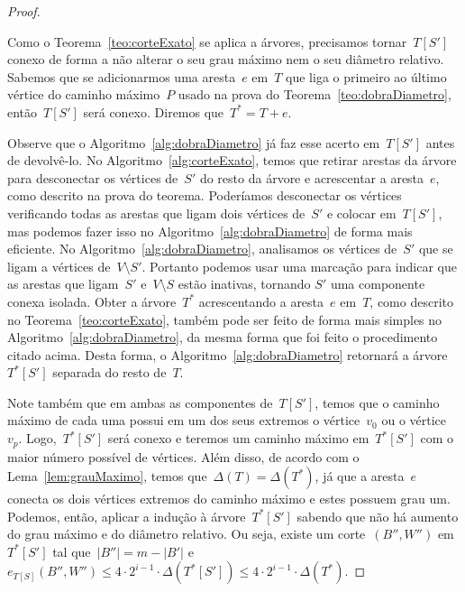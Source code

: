 \begin{proof}
\begin{center}
\begin{tikzpicture}
			\end{tikzpicture} \end{center}
			Como o Teorema~\ref{teo:corteExato} se aplica a 
			árvores, precisamos tornar~$T[S']$ conexo de forma a não 
			alterar o seu grau máximo nem o seu diâmetro relativo.
			Sabemos que se adicionarmos uma aresta~$e$ em~$T$ que 
			liga o primeiro ao último vértice do caminho máximo~$P$
			usado na prova do Teorema~\ref{teo:dobraDiametro},
			então~$T[S']$ será conexo. 
			Diremos que~${T^* = T+ e}$.

			Observe que o Algoritmo~\ref{alg:dobraDiametro} já faz
			esse acerto em~$T[S']$ antes de devolvê-lo.
			No Algoritmo~\ref{alg:corteExato}, temos que 
			retirar arestas da árvore para 
			desconectar os vértices de~$S'$ do resto da árvore
			e acrescentar a aresta~$e$, como descrito na prova do teorema.
			Poderíamos desconectar os vértices verificando todas as arestas que 
			ligam dois vértices de~$S'$ e colocar em~$T[S']$, mas podemos
			fazer isso no Algoritmo~\ref{alg:dobraDiametro} de forma 
			mais eficiente. 
			No Algoritmo~\ref{alg:dobraDiametro},
			analisamos os vértices de~$S'$ que se ligam a vértices 
			de~$V\setminus S'$. 
			Portanto podemos usar uma marcação para indicar que as 
			arestas que ligam~$S'$ e~${V\setminus S}$ estão inativas, 
			tornando $S'$ uma componente conexa isolada. 
			Obter a árvore~$T^*$ acrescentando a aresta~$e$ em~$T$, como descrito no
			Teorema~\ref{teo:corteExato}, também pode ser feito de 
			forma mais simples no Algoritmo~\ref{alg:dobraDiametro},
			da mesma forma que foi feito o procedimento citado acima.
			Desta forma, o Algoritmo~\ref{alg:dobraDiametro} retornará
			a árvore~$T^*[S']$ separada do resto de~$T$.

			Note também que em ambas as componentes de~$T[S']$, 
			temos que o caminho máximo de cada uma possui em um dos
			seus extremos o vértice~$v_0$ ou o vértice~$v_p$.
			Logo,~$T^*[S']$ será conexo e 
			teremos um caminho máximo 
			em~$T^*[S']$ com o maior número possível de vértices.
			Além disso, de acordo com o Lema~\ref{lem:grauMaximo}, 
			temos que~${\Delta(T) = \Delta(T^*)}$, já que a aresta~$e$ 
			conecta os dois vértices extremos do caminho máximo
			e estes possuem grau um.
			Podemos, então, aplicar a indução à árvore~$T^*[S']$ 
			sabendo que não há aumento
			do grau máximo e do diâmetro relativo.
			Ou seja,
			existe um corte~$(B'',W'')$ em~$T^*[S']$
			tal que~${|B''|=m-|B'|}$ 
			e~${e_{T[S]}(B'',W'')\le 4\cdot 2^{i-1}\cdot
			\Delta(T^*[S'])\le 4\cdot 2^{i-1}\cdot\Delta(T^*)}$.


\end{proof}
